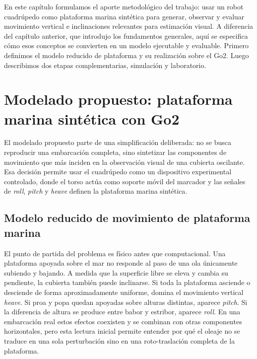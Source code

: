 \documentclass[12pt,a4paper]{report}
\begin{document}
En este capítulo formulamos el aporte metodológico del trabajo: usar un robot
cuadrúpedo como plataforma marina sintética para generar, observar y evaluar
movimiento vertical e inclinaciones relevantes para estimación visual. A
diferencia del capítulo anterior, que introdujo los fundamentos generales, aquí
se especifica cómo esos conceptos se convierten en un modelo ejecutable y
evaluable. Primero definimos el modelo reducido de plataforma y su realización
sobre el Go2. Luego describimos dos etapas complementarias, simulación y
laboratorio.

\section{Modelado propuesto: plataforma marina sintética con Go2}

El modelado propuesto parte de una simplificación deliberada: no se busca
reproducir una embarcación completa, sino sintetizar las componentes de
movimiento que más inciden en la observación visual de una cubierta oscilante.
Esa decisión permite usar el cuadrúpedo como un dispositivo experimental
controlado, donde el torso actúa como soporte móvil del marcador y las señales
de \emph{roll}, \emph{pitch} y \emph{heave} definen la plataforma marina
sintética.

\subsection{Modelo reducido de movimiento de plataforma marina}

El punto de partida del problema es físico antes que computacional. Una
plataforma apoyada sobre el mar no responde al paso de una ola únicamente
subiendo y bajando. A medida que la superficie libre se eleva y cambia su
pendiente, la cubierta también puede inclinarse. Si toda la plataforma asciende
o desciende de forma aproximadamente uniforme, domina el movimiento vertical
\emph{heave}. Si proa y popa quedan apoyadas sobre alturas distintas, aparece
\emph{pitch}. Si la diferencia de altura se produce entre babor y estribor,
aparece \emph{roll}. En una embarcación real estos efectos coexisten y se
combinan con otras componentes horizontales, pero esta lectura inicial permite
entender por qué el oleaje no se traduce en una sola perturbación sino en una
roto-traslación completa de la plataforma.
\end{document}
